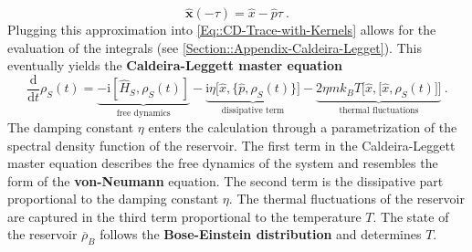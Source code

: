 	\begin{equation}
		\boldsymbol{\hat{x}}(-\tau) =	\hat{x} - \hat{p} \tau~.
	\end{equation}
	Plugging this approximation into \autoref{Eq::CD-Trace-with-Kernels} allows for the evaluation of the integrals (see \autoref{Section::Appendix-Caldeira-Legget}). This eventually yields the \textbf{Caldeira-Leggett master equation}
	\begin{equation} \label{Eq::Caldeira-Leggett-Master-equation}
		\frac{\text{d}}{\text{d}t} \rho_S(t) =	\underbrace{-\mathrm{i}\left[\hat{H}_S, \rho_S(t) \right]}_{\text{free dynamics}} - \underbrace{\mathrm{i} \eta \Big [\hat{x}, \big\{\hat{p}, \rho_S(t)\big\}\Big ]}_\text{dissipative term} - \underbrace{2 \eta m k_B T \Big [\hat{x}, \big[\hat{x}, \rho_S(t)\big]\Big ]}_\text{thermal fluctuations}~.
	\end{equation}
	The damping constant $\eta$ enters the calculation through a parametrization of the spectral density function of the reservoir. The first term in the Caldeira-Leggett master equation describes the free dynamics of the system and resembles the form of the \textbf{von-Neumann} equation. The second term is the dissipative part proportional to the damping constant $\eta$. The thermal fluctuations of the reservoir are captured in the third term proportional to the temperature $T$. The state of the reservoir $\overline{\rho}_B$ follows the \textbf{Bose-Einstein distribution} and determines $T$.
